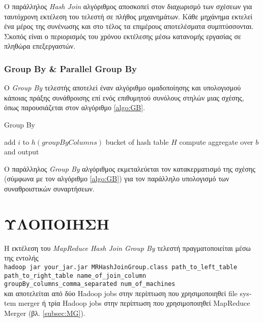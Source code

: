 \documentclass{article}
\newcommand{\en}[1]{\foreignlanguage{english}{#1}}
\begin{document}

Ο παράλληλος \emph{\en{Hash Join}} αλγόριθμος αποσκοπεί στον διαχωρισμό των σχέσεων για ταυτόχρονη εκτέλεση του τελεστή σε πλήθος μηχανημάτων. Κάθε μηχάνημα εκτελεί ένα μέρος της συνένωσης και στο τέλος τα επιμέρους αποτελέσματα συμπτύσσονται. Σκοπός είναι ο περιορισμός του χρόνου εκτέλεσης μέσω κατανομής εργασίας σε πληθώρα επεξεργαστών.
 
\subsubsection{\en{Group By \& Parallel Group By}}\label{subsubsec:GroupBy}

Ο \emph{\en{Group By}} τελεστής αποτελεί έναν αλγόριθμο ομαδοποίησης και υπολογισμού κάποιας πράξης συνάθροισης επί ενός επιθυμητού συνόλους στηλών μιας σχέσης, όπως παρουσιάζεται στον αλγόριθμο \ref{algo:GB}.

\begin{algorithm}
\caption{Group By}
\label{algo:GB}
\begin{algorithmic}[1]
\State add $i$ to $h(groupByColumns)$ bucket of hash table $H$
\EndFor
{}
\State compute aggregate over $b$ and output
\EndFor
\EndProcedure
\end{algorithmic}
\end{algorithm}

Ο παράλληλος \emph{\en{Group By}} αλγόριθμος εκμεταλεύεται τον κατακερματισμό της σχέσης (σύμφωνα με τον αλγόριθμο \ref{algo:GB}) για τον παράλληλο υπολογισμό των συναθροιστικών συναρτήσεων.

\section{ΥΛΟΠΟΙΗΣΗ} \label{sec:Impl}

Η εκτέλεση του \emph{\en{MapReduce Hash Join Group By}} τελεστή πραγματοποιείται μέσω της εντολής \\ \texttt{\en{hadoop jar your\_jar.jar MRHashJoinGroup.class path\_to\_left\_table path\_to\_right\_table
name\_of\_join\_column groupBy\_columns\_comma\_separated num\_of\_machines}}\\
 και αποτελείται από δύο \en{Hadoop jobs} στην περίπτωση που χρησιμοποιηθεί \en{file system merger} ή τρία \en{Hadoop jobs} στην περίπτωση που χρησιμοποιηθεί \en{MapReduce Merger} (βλ. \ref{subsec:MG}).
 
\end{document}
